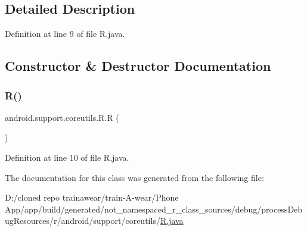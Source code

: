 \subsection{Detailed Description}


Definition at line 9 of file R.\+java.



\subsection{Constructor \& Destructor Documentation}
\mbox{\label{classandroid_1_1support_1_1coreutils_1_1_r_a8b937fa0ffc3844f88768f1241763f97}} 
\subsubsection{\texorpdfstring{R()}{R()}}
{\footnotesize\ttfamily android.\+support.\+coreutils.\+R.\+R (\begin{DoxyParamCaption}{ }\end{DoxyParamCaption})\hspace{0.3cm}{\ttfamily [private]}}



Definition at line 10 of file R.\+java.


\begin{DoxyCode}{0}

\end{DoxyCode}


The documentation for this class was generated from the following file\+:\begin{DoxyCompactItemize}
\item 
D\+:/cloned repo trainawear/train-\/\+A-\/wear/\+Phone App/app/build/generated/not\+\_\+namespaced\+\_\+r\+\_\+class\+\_\+sources/debug/process\+Debug\+Resources/r/android/support/coreutils/\mbox{\hyperlink{process_debug_resources_2r_2android_2support_2coreutils_2_r_8java}{R.\+java}}\end{DoxyCompactItemize}
